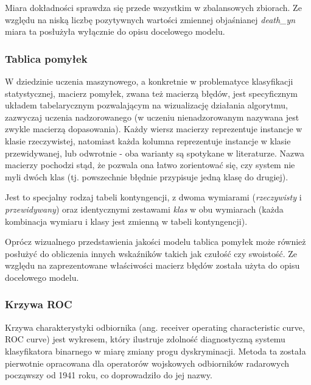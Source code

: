 \documentclass[polish, twoside, 12pt, a4paper]{article}
\theoremstyle{definition}
\theoremstyle{plain}
\theoremstyle{remark}
\begin{document}
Miara dokładności sprawdza się przede wszystkim w zbalansowych zbiorach. Ze względu na niską liczbę pozytywnych wartości zmiennej objaśnianej \emph{death\_yn} miara ta posłużyła wyłącznie do opisu docelowego modelu.\cite{tharwat2018}

\subsubsection{Tablica pomyłek}

W dziedzinie uczenia maszynowego, a konkretnie w problematyce klasyfikacji statystycznej, macierz pomyłek, zwana też macierzą błędów, jest specyficznym układem tabelarycznym pozwalającym na wizualizację działania algorytmu, zazwyczaj uczenia nadzorowanego (w uczeniu nienadzorowanym nazywana jest zwykle macierzą dopasowania). Każdy wiersz macierzy reprezentuje instancje w klasie rzeczywistej, natomiast każda kolumna reprezentuje instancje w klasie przewidywanej, lub odwrotnie - oba warianty są spotykane w literaturze. Nazwa macierzy pochodzi stąd, że pozwala ona łatwo zorientować się, czy system nie myli dwóch klas (tj. powszechnie błędnie przypisuje jedną klasę do drugiej).

Jest to specjalny rodzaj tabeli kontyngencji, z dwoma wymiarami (\emph{rzeczywisty} i \emph{przewidywany}) oraz identycznymi zestawami \emph{klas} w obu wymiarach (każda kombinacja wymiaru i klasy jest zmienną w tabeli kontyngencji). \cite{powers2011}

Oprócz wizualnego przedstawienia jakości modelu tablica pomyłek może również posłużyć do obliczenia innych wskaźników takich jak czułość czy swoistość. Ze względu na zaprezentowane właściwości macierz błędów została użyta do opisu docelowego modelu.

\subsubsection{Krzywa ROC}

Krzywa charakterystyki odbiornika (ang. receiver operating characteristic curve, ROC curve) jest wykresem, który ilustruje zdolność diagnostyczną systemu klasyfikatora binarnego w miarę zmiany progu dyskryminacji. Metoda ta została pierwotnie opracowana dla operatorów wojskowych odbiorników radarowych począwszy od 1941 roku, co doprowadziło do jej nazwy.
\end{document}

